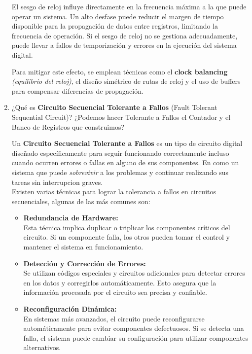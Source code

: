 \documentclass[12pt,letterpaper]{article}
\begin{document}
\begin{enumerate}
    El sesgo de reloj influye directamente en la frecuencia máxima a la que puede operar un sistema. Un alto desfase puede reducir el margen de tiempo disponible para la propagación de datos entre registros, limitando la frecuencia de operación. Si el sesgo de reloj no se gestiona adecuadamente, puede llevar a fallos de temporización y errores en la ejecución del sistema digital.
    
    Para mitigar este efecto, se emplean técnicas como el \textbf{clock balancing} \textit{(equilibrio del reloj)}, el diseño simétrico de rutas de reloj y el uso de buffers para compensar diferencias de propagación.
    
    \bigskip
    
  \item ¿Qué es \textbf{Circuito Secuencial Tolerante a Fallos} (Fault Tolerant Sequential Circuit)? ¿Podemos hacer Tolerante a Fallos el Contador y el Banco de Registros que construimos?
    \bigskip

    Un \textbf{Circuito Secuencial Tolerante a Fallos} es un tipo de circuito digital diseñado específicamente para seguir funcionando correctamente incluso cuando ocurren errores o fallas en alguno de sus componentes. En como un sistema que puede \textit{sobrevivir} a los problemas y continuar realizando sus tareas sin interrupcion graves.\\
    Existen varias técnicas para lograr la tolerancia a fallos en circuitos secuenciales, algunas de las más comunes son:

    \begin{itemize}
    \item \textbf{Redundancia de Hardware:}\\
      Esta técnica implica duplicar o triplicar los componentes críticos del circuito. Si un componente falla, los otros pueden tomar el control y mantener el sistema en funcionamiento.
      
    \item \textbf{Detección y Corrección de Errores:}\\
      Se utilizan códigos especiales y circuitos adicionales para detectar errores en los datos y corregirlos automáticamente. Esto asegura que la información procesada por el circuito sea precisa y confiable.
      
    \item \textbf{Reconfiguración Dinámica:}\\
      En sistemas más avanzados, el circuito puede reconfigurarse automáticamente para evitar componentes defectuosos. Si se detecta una falla, el sistema puede cambiar su configuración para utilizar componentes alternativos.
      

\end{itemize}
\end{enumerate}
\end{document}
